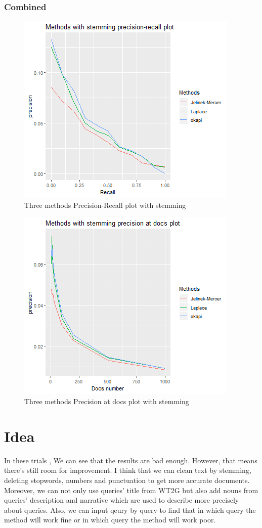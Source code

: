 \documentclass[a4pper,11pt,onecolumn]{article}
\begin{document}
\subsubsection{Combined}
\begin{figure}[H]
\caption{Three methods Precision-Recall plot with stemming}
\includegraphics[scale = 0.6]{stemming_pr.png}
\centering
\end{figure}

\begin{figure}[H]
\caption{Three methods Precision at docs plot with stemming}
\includegraphics[scale = 0.6]{stemming_doc.png}
\centering
\end{figure}

\section{Idea}
In these trials , We can see that the results are bad enough. However, that means there's still room for improvement. I think that we can clean text by stemming, deleting stopwords, numbers and punctuation to get more accurate documents. Moreover, we can not only use queries' title from WT2G but also add nouns from queries' description and narrative which are used to describe more precisely about queries. Also, we can input qeury by query to find that in which query the method will work fine or in which query the method will work poor.
\end{document}
